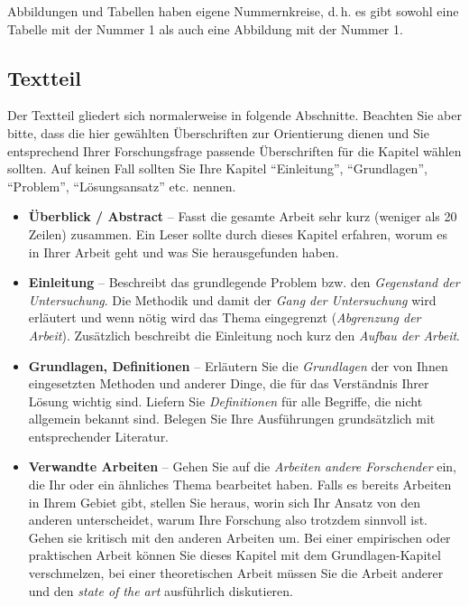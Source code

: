 \documentclass[a4paper,11pt,headings=normal]{scrartcl}
\begin{document}
Abbildungen und Tabellen haben eigene Nummernkreise, d.\,h. es gibt sowohl eine Tabelle mit der Nummer 1 als auch eine Abbildung mit der Nummer 1.

\subsection{Textteil}
Der Textteil gliedert sich normalerweise in folgende Abschnitte. Beachten Sie aber bitte, dass die hier gewählten Überschriften zur Orientierung dienen und Sie entsprechend Ihrer Forschungsfrage passende Überschriften für die Kapitel wählen sollten. Auf keinen Fall sollten Sie Ihre Kapitel "`Einleitung"', "`Grundlagen"', "`Problem"', "`Lösungsansatz"' etc. nennen.

\begin{itemize}
\item \textbf{Überblick / Abstract} -- Fasst die gesamte Arbeit sehr kurz (weniger als 20 Zeilen) zusammen. Ein Leser sollte durch dieses Kapitel erfahren, worum es in Ihrer Arbeit geht und was Sie herausgefunden haben.

\item \textbf{Einleitung} -- Beschreibt das grundlegende Problem bzw. den \textit{Gegenstand der Untersuchung}. Die Methodik und damit der \textit{Gang der Untersuchung} wird erläutert und wenn nötig wird das Thema eingegrenzt (\textit{Abgrenzung der Arbeit}). Zusätzlich beschreibt die Einleitung noch kurz den \textit{Aufbau der Arbeit}.

\item \textbf{Grundlagen, Definitionen} -- Erläutern Sie die \textit{Grundlagen} der von Ihnen eingesetzten Methoden und anderer Dinge, die für das Verständnis Ihrer Lösung wichtig sind. Liefern Sie \textit{Definitionen} für alle Begriffe, die nicht allgemein bekannt sind. Belegen Sie Ihre Ausführungen grundsätzlich mit entsprechender Literatur.

\item \textbf{Verwandte Arbeiten} -- Gehen Sie auf die \textit{Arbeiten andere Forschender} ein, die Ihr oder ein ähnliches Thema bearbeitet haben. Falls es bereits Arbeiten in Ihrem Gebiet gibt, stellen Sie heraus, worin sich Ihr Ansatz von den anderen unterscheidet, warum Ihre Forschung also trotzdem sinnvoll ist. Gehen sie kritisch mit den anderen Arbeiten um. Bei einer empirischen oder praktischen Arbeit können Sie dieses Kapitel mit dem Grundlagen-Kapitel verschmelzen, bei einer theoretischen Arbeit müssen Sie die Arbeit anderer und den \textit{state of the art} ausführlich diskutieren.


\end{itemize}
\end{document}
